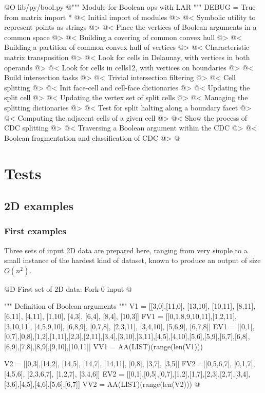 \documentclass[11pt,oneside]{article}	%
\begin{document}
@O lib/py/bool.py
@{""" Module for Boolean ops with LAR """
DEBUG = True
from matrix import *
@< Initial import of modules @>
@< Symbolic utility to represent points as strings @>
@< Place the vertices of Boolean arguments in a common space @>
@< Building a covering of common convex hull @>
@< Building a partition of common convex hull of vertices @>
@< Characteristic matrix transposition @>
@< Look for cells in Delaunay, with vertices in both operands @>
@< Look for cells in cells12, with vertices on boundaries @>
@< Build intersection tasks @>
@< Trivial intersection filtering @>
@< Cell splitting @>
@< Init face-cell and cell-face dictionaries @>
@< Updating the split cell @>
@< Updating the vertex set  of split cells @>
@< Managing the splitting dictionaries @>
@< Test for split halting along a boundary facet @>
@< Computing the adjacent cells of a given cell @>
@< Show the process of CDC splitting @>
@< Traversing a Boolean argument within the CDC @>
@< Boolean fragmentation and classification of CDC @>
@}

\section{Tests}



\subsection{2D examples}

\subsubsection{First examples}

Three sets of input 2D data are prepared here, ranging from very simple to a small instance of the hardest kind of dataset, known to produce an output of size $O(n^2)$.


@D First set of 2D data: Fork-0 input
@{""" Definition of Boolean arguments """
V1 = [[3,0],[11,0], [13,10], [10,11], [8,11], [6,11], [4,11], [1,10], [4,3], [6,4], 
	[8,4], [10,3]]
FV1 = [[0,1,8,9,10,11],[1,2,11], [3,10,11], [4,5,9,10], [6,8,9], [0,7,8], [2,3,11],
	[3,4,10], [5,6,9], [6,7,8]]
EV1 = [[0,1],[0,7],[0,8],[1,2],[1,11],[2,3],[2,11],[3,4],[3,10],[3,11],[4,5],[4,10],[5,6],[5,9],[6,7],[6,8],[6,9],[7,8],[8,9],[9,10],[10,11]]
VV1 = AA(LIST)(range(len(V1)))

V2 = [[0,3],[14,2], [14,5], [14,7], [14,11], [0,8], [3,7], [3,5]]
FV2 =[[0,5,6,7], [0,1,7], [4,5,6], [2,3,6,7], [1,2,7], [3,4,6]]
EV2 = [[0,1],[0,5],[0,7],[1,2],[1,7],[2,3],[2,7],[3,4],[3,6],[4,5],[4,6],[5,6],[6,7]]
VV2 = AA(LIST)(range(len(V2)))
@}
\end{document}
